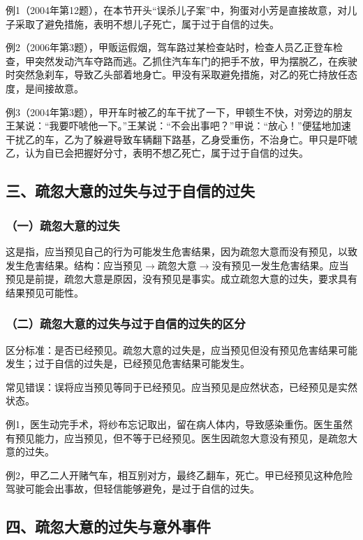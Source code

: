 例1（2004年第12题），在本节开头“误杀儿子案”中，狗蛋对小芳是直接故意，对儿子采取了避免措施，表明不想儿子死亡，属于过于自信的过失。

例2（2006年第3题），甲贩运假烟，驾车路过某检查站时，检查人员乙正登车检查，甲突然发动汽车夺路而逃。乙抓住汽车车门的把手不放，甲为摆脱乙，在疾驶时突然急刹车，导致乙头部着地身亡。甲没有采取避免措施，对乙的死亡持放任态度，是间接故意。

例3（2004年第3题），甲开车时被乙的车干扰了一下，甲顿生不快，对旁边的朋友王某说：“我要吓唬他一下。”王某说：“不会出事吧？”甲说：“放心！”便猛地加速干扰乙的车，乙为了躲避导致车辆翻下路基，乙身受重伤，不治身亡。甲只是吓唬乙，认为自已会把握好分寸，表明不想乙死亡，属于过于自信的过失。

\subsection*{三、疏忽大意的过失与过于自信的过失}

\subsubsection*{（一）疏忽大意的过失}

这是指，应当预见自己的行为可能发生危害结果，因为疏忽大意而没有预见，以致发生危害结果。结构：应当预见\ensuremath{\rightarrow}疏忽大意\ensuremath{\rightarrow}没有预见一发生危害结果。应当预见是前提，疏忽大意是原因，没有预见是事实。成立疏忽大意的过失，要求具有结果预见可能性。

\subsubsection*{（二）疏忽大意的过失与过于自信的过失的区分}

区分标准：是否已经预见。疏忽大意的过失是，应当预见但没有预见危害结果可能发生；过于自信的过失是，已经预见危害结果可能发生。

常见错误：误将应当预见等同于已经预见。应当预见是应然状态，已经预见是实然状态。

例1，医生动完手术，将纱布忘记取出，留在病人体内，导致感染重伤。医生虽然有预见能力，应当预见，但不等于已经预见。医生因疏忽大意没有预见，是疏忽大意的过失。

例2，甲乙二人开赌气车，相互别对方，最终乙翻车，死亡。甲已经预见这种危险驾驶可能会出事故，但轻信能够避免，是过于自信的过失。

\subsection*{四、疏忽大意的过失与意外事件}

